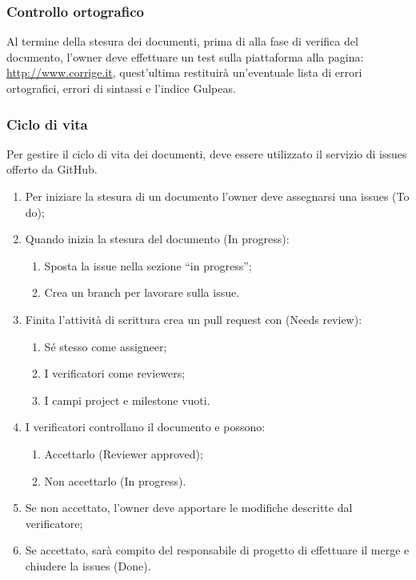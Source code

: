\subsubsection{Controllo ortografico}
Al termine della stesura dei documenti, prima di alla fase di verifica del documento, l’owner deve effettuare un test sulla piattaforma alla pagina: \url{ http://www.corrige.it}, quest’ultima restituirà un’eventuale lista di errori ortografici, errori di sintassi e l’indice Gulpeas.

\subsubsection{Ciclo di vita}
Per gestire il ciclo di vita dei documenti, deve essere utilizzato il servizio di issues offerto da GitHub.
\begin{enumerate}
\item Per iniziare la stesura di un documento l’owner deve assegnarsi una issues (To do);
\item Quando inizia la stesura del documento (In progress):
	\begin{enumerate}
		\item Sposta la issue nella sezione “in progress”;
		\item Crea un branch per lavorare sulla issue.
	\end{enumerate}
\item Finita l’attività di scrittura crea un pull request con (Needs review):
	\begin{enumerate}
		\item Sé stesso come assigneer;
		\item I verificatori come reviewers;
		\item I campi project e milestone vuoti.
	\end{enumerate} 
\item I verificatori controllano il documento e possono:
	\begin{enumerate}
	 	\item Accettarlo (Reviewer approved);
	 	\item Non accettarlo (In progress).
	\end{enumerate}
\item Se non accettato, l’owner deve apportare le modifiche descritte dal verificatore;
\item Se accettato, sarà compito del responsabile di progetto di effettuare il merge e chiudere la issues (Done).
\end{enumerate}



